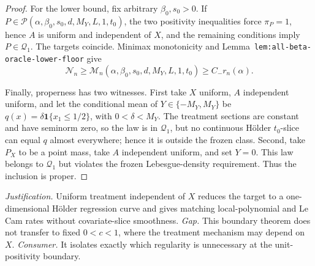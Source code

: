 \documentclass{article}
\begin{document}
\begin{proof}
For the lower bound, fix arbitrary \(\beta_0,s_0>0\). If \(P\in\mathcal P(\alpha,\beta_0,s_0,d,M_Y,L,1,t_0)\), the two positivity inequalities force \(\pi_P=1\), hence \(A\) is uniform and independent of \(X\), and the remaining conditions imply \(P\in\mathcal Q_1\). The targets coincide. Minimax monotonicity and Lemma~\texttt{lem:all-beta-oracle-lower-floor} give
\[
\mathcal N_n\ge\mathcal M_n(\alpha,\beta_0,s_0,d,M_Y,L,1,t_0)\ge C_-r_n(\alpha).
\]

Finally, properness has two witnesses. First take \(X\) uniform, \(A\) independent uniform, and let the conditional mean of \(Y\in\{-M_Y,M_Y\}\) be \(q(x)=\delta\mathbf1\{x_1\le1/2\}\), with \(0<\delta<M_Y\). The treatment sections are constant and have seminorm zero, so the law is in \(\mathcal Q_1\), but no continuous H\"older \(t_0\)-slice can equal \(q\) almost everywhere; hence it is outside the frozen class. Second, take \(P_X\) to be a point mass, take \(A\) independent uniform, and set \(Y=0\). This law belongs to \(\mathcal Q_1\) but violates the frozen Lebesgue-density requirement. Thus the inclusion is proper.
\end{proof}
\par\smallskip\noindent \textit{Justification.} Uniform treatment independent of \(X\) reduces the target to a one-dimensional H\"older regression curve and gives matching local-polynomial and Le Cam rates without covariate-slice smoothness. \textit{Gap.} This boundary theorem does not transfer to fixed \(0<c<1\), where the treatment mechanism may depend on \(X\). \textit{Consumer.} It isolates exactly which regularity is unnecessary at the unit-positivity boundary.
\end{document}
